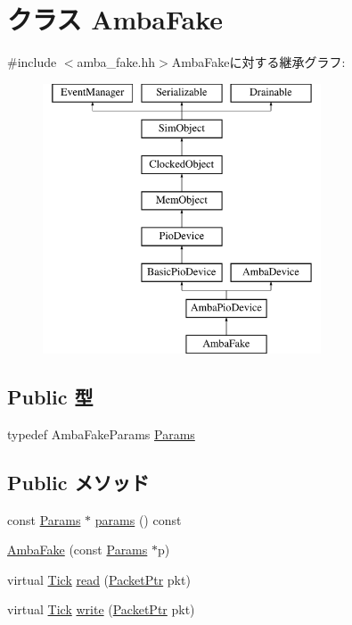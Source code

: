 \hypertarget{classAmbaFake}{
\section{クラス AmbaFake}
\label{classAmbaFake}
}


{\ttfamily \#include $<$amba\_\-fake.hh$>$}AmbaFakeに対する継承グラフ:\begin{figure}[H]
\begin{center}
\leavevmode
\includegraphics[height=8cm]{classAmbaFake}
\end{center}
\end{figure}
\subsection*{Public 型}
\begin{DoxyCompactItemize}
\item 
typedef AmbaFakeParams \hyperlink{classAmbaFake_af81895617462b041d86cd650bb1e27d3}{Params}
\end{DoxyCompactItemize}
\subsection*{Public メソッド}
\begin{DoxyCompactItemize}
\item 
const \hyperlink{classAmbaFake_af81895617462b041d86cd650bb1e27d3}{Params} $\ast$ \hyperlink{classAmbaFake_acd3c3feb78ae7a8f88fe0f110a718dff}{params} () const 
\item 
\hyperlink{classAmbaFake_a208b0127a0e255b708ddd1296d0ff092}{AmbaFake} (const \hyperlink{classAmbaFake_af81895617462b041d86cd650bb1e27d3}{Params} $\ast$p)
\item 
virtual \hyperlink{base_2types_8hh_a5c8ed81b7d238c9083e1037ba6d61643}{Tick} \hyperlink{classAmbaFake_a613ec7d5e1ec64f8d21fec78ae8e568e}{read} (\hyperlink{classPacket}{PacketPtr} pkt)
\item 
virtual \hyperlink{base_2types_8hh_a5c8ed81b7d238c9083e1037ba6d61643}{Tick} \hyperlink{classAmbaFake_a4cefab464e72b5dd42c003a0a4341802}{write} (\hyperlink{classPacket}{PacketPtr} pkt)
\end{DoxyCompactItemize}


